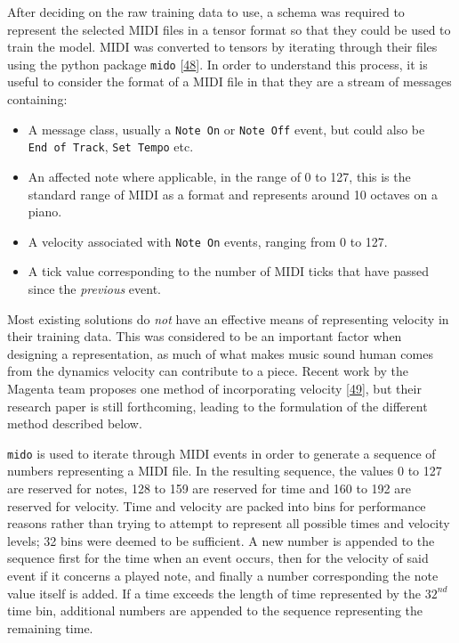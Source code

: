 \documentclass[12pt,]{article}
\providecommand{\tightlist}{%
  \setlength{\itemsep}{0pt}\setlength{\parskip}{0pt}}
\begin{document}
After deciding on the raw training data to use, a schema was required to
represent the selected MIDI files in a tensor format so that they could
be used to train the model. MIDI was converted to tensors by iterating
through their files using the python package \texttt{mido}
{[}\protect\hyperlink{ref-mido}{48}{]}. In order to understand this
process, it is useful to consider the format of a MIDI file in that they
are a stream of messages containing:

\begin{itemize}
\tightlist
\item
  A message class, usually a \texttt{Note\ On} or \texttt{Note\ Off}
  event, but could also be \texttt{End\ of\ Track}, \texttt{Set\ Tempo}
  etc.
\item
  An affected note where applicable, in the range of 0 to 127, this is
  the standard range of MIDI as a format and represents around 10
  octaves on a piano.
\item
  A velocity associated with \texttt{Note\ On} events, ranging from 0 to
  127.
\item
  A tick value corresponding to the number of MIDI ticks that have
  passed since the \emph{previous} event.
\end{itemize}

Most existing solutions do \emph{not} have an effective means of
representing velocity in their training data. This was considered to be
an important factor when designing a representation, as much of what
makes music sound human comes from the dynamics velocity can contribute
to a piece. Recent work by the Magenta team proposes one method of
incorporating velocity
{[}\protect\hyperlink{ref-performance-rnn-2017}{49}{]}, but their
research paper is still forthcoming, leading to the formulation of the
different method described below.

\texttt{mido} is used to iterate through MIDI events in order to
generate a sequence of numbers representing a MIDI file. In the
resulting sequence, the values 0 to 127 are reserved for notes, 128 to
159 are reserved for time and 160 to 192 are reserved for velocity. Time
and velocity are packed into bins for performance reasons rather than
trying to attempt to represent all possible times and velocity levels;
32 bins were deemed to be sufficient. A new number is appended to the
sequence first for the time when an event occurs, then for the velocity
of said event if it concerns a played note, and finally a number
corresponding the note value itself is added. If a time exceeds the
length of time represented by the \(32^{nd}\) time bin, additional
numbers are appended to the sequence representing the remaining time.
\end{document}
